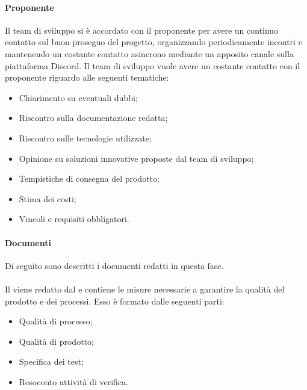 \paragraph{Proponente}\label{subsubsection: proponente_fornitura}
Il team di sviluppo si è accordato con il proponente per avere un continuo contatto sul buon proseguo del progetto, organizzando periodicamente incontri e mantenendo un costante contatto asincrono mediante un apposito canale sulla piattaforma Discord\glo{}.
Il team di sviluppo vuole avere un costante contatto con il proponente riguardo alle seguenti tematiche:
\begin {itemize}
\item Chiarimento su eventuali dubbi;
\item Riscontro sulla documentazione redatta;
\item Riscontro sulle tecnologie utilizzate;
\item Opinione su soluzioni innovative proposte dal team di sviluppo;
\item Tempistiche di consegna del prodotto;
\item Stima dei costi;
\item Vincoli e requisiti obbligatori.
\end{itemize}
\paragraph {Documenti}\label{subsubsection: documenti_fornitura}
Di seguito sono descritti i documenti redatti in questa fase.
\paragraph*{\docNamePdQ{}}\label{paragraph: PdQ_fornitura}
Il \docNamePdQLow{} viene redatto dal \roleVerifierLow{} e contiene le misure necessarie a garantire la qualità del prodotto e dei processi.
Esso è formato dalle seguenti parti:
\begin{itemize}
    \item Qualità di processo;
    \item Qualità di prodotto;
    \item Specifica dei test;
    \item Resoconto attività di verifica.
\end{itemize}
